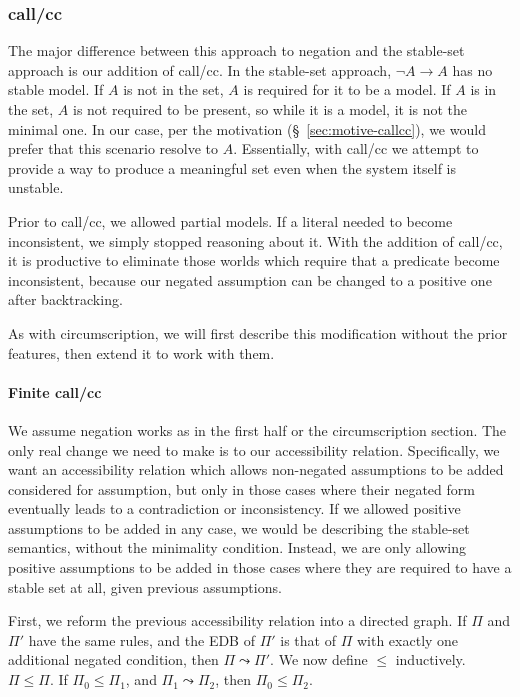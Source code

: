 \subsubsection{call/cc}
The major difference between this approach to negation and the stable-set approach is our addition of call/cc.
In the stable-set approach, $\neg A \rightarrow A$ has no stable model.
If $A$ is not in the set, $A$ is required for it to be a model.
If $A$ is in the set, $A$ is not required to be present, so while it is a model, it is not the minimal one.
In our case, per the motivation (\S~\ref{sec:motive-callcc}), we would prefer that this scenario resolve to $A$.
Essentially, with call/cc we attempt to provide a way to produce a meaningful set even when the system itself is unstable.

Prior to call/cc, we allowed partial models.
If a literal needed to become inconsistent, we simply stopped reasoning about it.
With the addition of call/cc, it is productive to eliminate those worlds which require that a predicate become inconsistent, because our negated assumption can be changed to a positive one after backtracking.

As with circumscription, we will first describe this modification without the prior features, then extend it to work with them.

\paragraph{Finite call/cc}
We assume negation works as in the first half or the circumscription section.
The only real change we need to make is to our accessibility relation.
Specifically, we want an accessibility relation which allows non-negated assumptions to be added considered for assumption, but only in those cases where their negated form eventually leads to a contradiction or inconsistency.
If we allowed positive assumptions to be added in any case, we would be describing the stable-set semantics, without the minimality condition.
Instead, we are only allowing positive assumptions to be added in those cases where they are required to have a stable set at all, given previous assumptions.

First, we reform the previous accessibility relation into a directed graph.
If $\Pi$ and $\Pi'$ have the same rules, and the EDB  of $\Pi'$ is that of $\Pi$ with exactly one additional negated condition, then $\Pi \leadsto \Pi'$.
We now define $\leq$ inductively.
$\Pi \leq \Pi$.
If $\Pi_0 \leq \Pi_1$, and $\Pi_1 \leadsto \Pi_2$, then $\Pi_0 \leq \Pi_2$.

